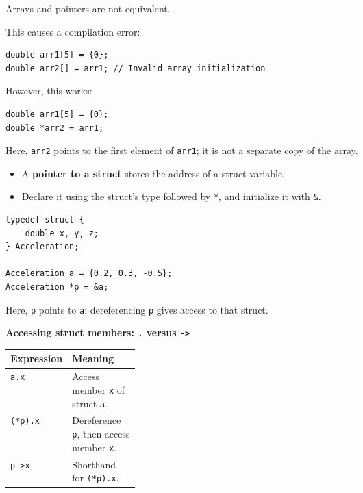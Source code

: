 \documentclass[11pt,a4paper]{article}
\begin{document}

Arrays and pointers are not equivalent.

This causes a compilation error:
\begin{lstlisting}[style=cscode]
double arr1[5] = {0};
double arr2[] = arr1; // Invalid array initialization
\end{lstlisting}

However, this works:
\begin{lstlisting}[style=cscode]
double arr1[5] = {0};
double *arr2 = arr1;
\end{lstlisting}

Here, \texttt{arr2} points to the first element of \texttt{arr1};
it is not a separate copy of the array.


\begin{itemize}
    \item A \textbf{pointer to a struct} stores the address of a
          struct variable.
    \item Declare it using the struct's type followed by
          \texttt{*}, and initialize it with \texttt{\&}.
\end{itemize}

\begin{lstlisting}[style=cscode]
typedef struct {
    double x, y, z;
} Acceleration;

Acceleration a = {0.2, 0.3, -0.5};
Acceleration *p = &a;
\end{lstlisting}

Here, \texttt{p} points to \texttt{a}; dereferencing \texttt{p}
gives access to that struct.

\textbf{Accessing struct members: \texttt{.} versus \texttt{->}}

\begin{longtable}{@{}
    >{\raggedright\arraybackslash}p{0.22\linewidth}
    >{\raggedright\arraybackslash}p{}@{}}
\toprule
\textbf{Expression} & \textbf{Meaning} \\
\midrule
\endhead
\bottomrule
\endlastfoot
\texttt{a.x}
    & Access member \texttt{x} of struct \texttt{a}. \\
\texttt{(*p).x}
    & Dereference \texttt{p}, then access member \texttt{x}. \\
\texttt{p->x}
    & Shorthand for \texttt{(*p).x}. \\
\end{longtable}
\end{document}
